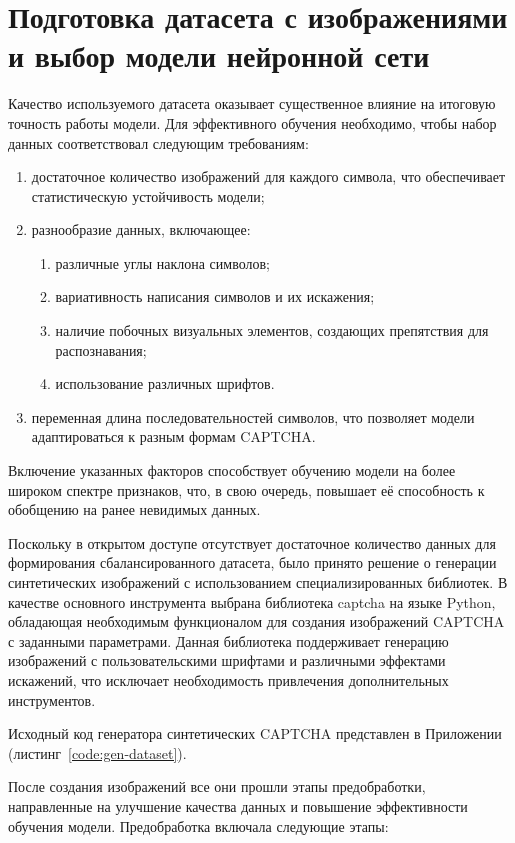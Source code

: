\documentclass{altsu-report}
\begin{document}
\section{Подготовка датасета с изображениями и выбор модели нейронной сети}

Качество используемого датасета оказывает существенное влияние на итоговую точность работы модели. Для эффективного обучения необходимо, чтобы набор данных соответствовал следующим требованиям:

\begin{enumerate}
    \item достаточное количество изображений для каждого символа, что обеспечивает статистическую устойчивость модели;
    \item разнообразие данных, включающее:
    \begin{enumerate}
        \item различные углы наклона символов;
        \item вариативность написания символов и их искажения;
        \item наличие побочных визуальных элементов, создающих препятствия для распознавания;
        \item использование различных шрифтов.
    \end{enumerate}
    \item переменная длина последовательностей символов, что позволяет модели адаптироваться к разным формам CAPTCHA.
\end{enumerate}

Включение указанных факторов способствует обучению модели на более широком спектре признаков, что, в свою очередь, повышает её способность к обобщению на ранее невидимых данных.

Поскольку в открытом доступе отсутствует достаточное количество данных для формирования сбалансированного датасета, было принято решение о генерации синтетических изображений с использованием специализированных библиотек. В качестве основного инструмента выбрана библиотека captcha на языке Python, обладающая необходимым функционалом для создания изображений CAPTCHA с заданными параметрами. Данная библиотека поддерживает генерацию изображений с пользовательскими шрифтами и различными эффектами искажений, что исключает необходимость привлечения дополнительных инструментов.

Исходный код генератора синтетических CAPTCHA представлен в Приложении (листинг~\ref{code:gen-dataset}).

После создания изображений все они прошли этапы предобработки, направленные на улучшение качества данных и повышение эффективности обучения модели. Предобработка включала следующие этапы:
\end{document}
